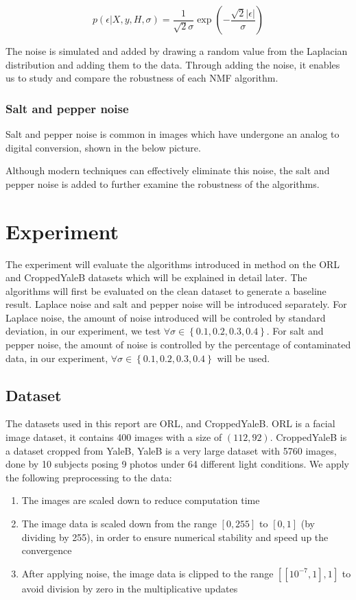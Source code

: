 \documentclass{article} %
\begin{document}
\begin{equation}
p \left ( \epsilon | X,y,H,\sigma \right ) = \frac{1}{\sqrt{2}\sigma} \exp \left ( -\frac{\sqrt{2}\left | \epsilon  \right |}{\sigma} \right )
\end{equation}

The noise is simulated and added by drawing a random value from the Laplacian distribution and adding them to the data. Through adding the noise, it enables us to study and compare the robustness of each NMF algorithm.

\subsubsection{Salt and pepper noise}
Salt and pepper noise is common in images which have undergone an analog to digital conversion, shown in the below picture.

Although modern techniques can effectively eliminate this noise, the salt and pepper noise is added to further examine the robustness of the algorithms.

\section{Experiment}
The experiment will evaluate the algorithms introduced in method on the ORL and CroppedYaleB datasets which will be explained in detail later. The algorithms will first be evaluated on the clean dataset to generate a baseline result. Laplace noise and salt and pepper noise will be introduced separately. For Laplace noise, the amount of noise introduced will be controled by standard deviation, in our experiment, we test $\forall \sigma \in  \left \{ 0.1,0.2,0.3,0.4 \right \}$. For salt and pepper noise, the amount of noise is controlled by the percentage of contaminated data, in our experiment, $\forall \sigma \in  \left \{ 0.1,0.2,0.3,0.4 \right \}$ will be used.

\subsection{Dataset}
The datasets used in this report are ORL, and CroppedYaleB. ORL is a facial image dataset, it contains 400 images with a size of $\left(112,92\right)$. CroppedYaleB is a dataset cropped from YaleB, YaleB is a very large dataset with 5760 images, done by 10 subjects posing 9 photos under 64 different light conditions. We apply the following preprocessing to the data:

\begin{enumerate}
\item The images are scaled down to reduce computation time
\item The image data is scaled down from the range $\left [ 0,255 \right ]$ to $\left [ 0,1 \right ]$ (by dividing by 255), in order to ensure numerical stability and speed up the convergence
\item After applying noise, the image data is clipped to the range $\left [ \left [ 10^{-7},1 \right ],1 \right ]$ to avoid division by zero in the multiplicative updates
\end{enumerate}
\end{document}
